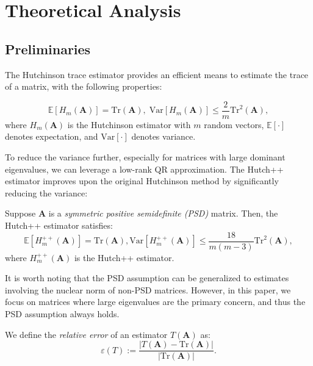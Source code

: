 \section{Theoretical Analysis}

\subsection{Preliminaries}

The Hutchinson trace estimator provides an efficient means to estimate the trace of a matrix, with the following properties:

\begin{lemma}
\begin{equation}
    \mathbb{E}[H_m(\mathbf{A})] = \mathrm{Tr}(\mathbf{A}), \; \mathrm{Var}[H_m(\mathbf{A})] \le \frac{2}{m} \mathrm{Tr}^2(\mathbf{A}), \label{eqn:VanHut}
\end{equation}
where $H_m(\mathbf{A})$ is the Hutchinson estimator with $m$ random vectors, $\mathbb{E}[\cdot]$ denotes expectation, and $\mathrm{Var}[\cdot]$ denotes variance.
\end{lemma}

To reduce the variance further, especially for matrices with large dominant eigenvalues, we can leverage a low-rank QR approximation. The Hutch++ estimator improves upon the original Hutchinson method by significantly reducing the variance:

\begin{lemma} 
Suppose $\mathbf{A}$ is a \emph{symmetric positive semidefinite (PSD)} matrix. Then, the Hutch++ estimator satisfies:
\begin{equation}
    \mathbb{E}[H_m^{++}(\mathbf{A})] = \mathrm{Tr}(\mathbf{A}),\mathrm{Var}[H_m^{++}(\mathbf{A})] \le \frac{18}{m(m-3)} \mathrm{Tr}^2(\mathbf{A}),
\end{equation}
where $H_m^{++}(\mathbf{A})$ is the Hutch++ estimator.
\end{lemma}

It is worth noting that the PSD assumption can be generalized to estimates involving the nuclear norm of non-PSD matrices. However, in this paper, we focus on matrices where large eigenvalues are the primary concern, and thus the PSD assumption always holds.

We define the \emph{relative error} of an estimator $T(\mathbf{A})$ as:
\begin{equation*}
    \varepsilon(T) := \frac{|T(\mathbf{A}) - \mathrm{Tr}(\mathbf{A})|}{|\mathrm{Tr}(\mathbf{A})|}.
\end{equation*}

